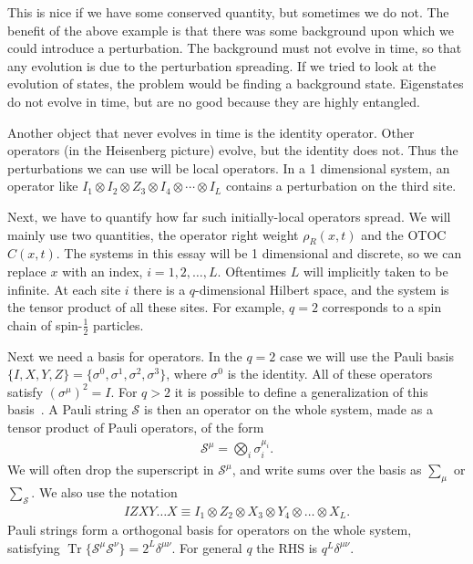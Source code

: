 \documentclass[a4paper,12pt]{article}
\newcommand{\half}{\frac{1}{2}}
\renewcommand{\S}{\mathcal{S}}
\DeclareMathOperator{\Tr}{Tr}
\begin{document}
This is nice if we have some conserved quantity, but sometimes we do not. The benefit of the above example is that there was some background upon which we could introduce a perturbation. The background must not evolve in time, so that any evolution is due to the perturbation spreading.
If we tried to look at the evolution of states, the problem would be finding a background state. 
Eigenstates do not evolve in time, but are no good because they are highly entangled.

Another object that never evolves in time is the identity operator. Other operators (in the Heisenberg picture) evolve, but the identity does not. Thus the perturbations we can use will be local operators. In a 1 dimensional system, an operator like $I_1\otimes I_2\otimes Z_3 \otimes I_4\otimes\cdots\otimes I_L$ contains a perturbation on the third site. 

Next, we have to quantify how far such initially-local operators spread. We will mainly use two quantities, the operator right weight $\rho_R(x,t)$ and the OTOC $C(x,t)$. The systems in this essay will be 1 dimensional and discrete, so we can replace $x$ with an index, $i = 1,2,\dots,L$. Oftentimes $L$ will implicitly taken to be infinite. At each site $i$ there is a $q$-dimensional Hilbert space, and the system is the tensor product of all these sites. For example, $q=2$ corresponds to a spin chain of spin-$\half$ particles.

Next we need a basis for operators. In the $q=2$ case we will use the Pauli basis $\{I, X, Y, Z\} = \{\sigma^0, \sigma^1, \sigma^2, \sigma^3\}$, where $\sigma^0$ is the identity. All of these operators satisfy $(\sigma^\mu)^2=I$. For $q>2$ it is possible to define a generalization of this basis~\cite{vonKeyserlingkHydro}. A Pauli string $\S$ is then an operator on the whole system, made as a tensor product of Pauli operators, of the form
\begin{align}
\S^\mu = \bigotimes_i\sigma_i^{\mu_i}.
\end{align}
We will often drop the superscript in $\S^\mu$, and write sums over the basis as $\sum_\mu$ or $\sum_\S$. We also use the notation 
\begin{align}
IZXY\dots X \equiv I_1\otimes Z_2\otimes X_3\otimes Y_4 \otimes\dots\otimes X_L.
\end{align}
Pauli strings form a orthogonal basis for operators on the whole system, satisfying $\Tr\{\S^\mu\S^\nu\} = 2^L\delta^{\mu\nu}$. For general $q$ the RHS is $q^L\delta^{\mu\nu}$. 
\end{document}
